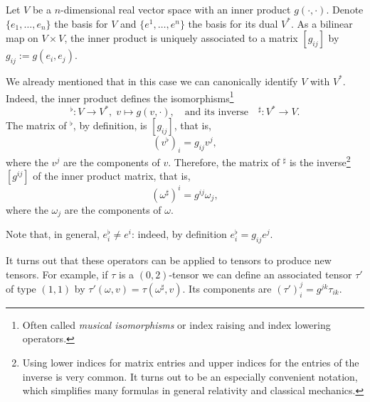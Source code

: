 \begin{example}\label{ex:musicaliso}
  Let $V$ be a $n$-dimensional real vector space with an inner product $g(\cdot, \cdot)$.
  Denote $\{e_1, \ldots, e_n\}$ the basis for $V$ and $\{e^1, \ldots, e^n\}$ the basis for its dual $V^*$.
  As a bilinear map on $V\times V$, the inner product is uniquely associated to a matrix $[g_{ij}]$ by $g_{ij} := g(e_i, e_j)$.

  We already mentioned that in this case we can canonically identify $V$ with $V^*$.
  Indeed, the inner product defines the isomorphisms\footnote{Often called \emph{musical isomorphisms} or index raising and index lowering operators.}
  \begin{equation}
    {}^\flat: V \to V^*,\; v\mapsto g(v, \cdot),
    \quad\mbox{and its inverse}\quad
    {}^\sharp: V^*\to V.
  \end{equation}
  The matrix of ${}^\flat$, by definition, is $[g_{ij}]$, that is,
  \begin{equation}
    (v^\flat)_i = g_{ij} v^j,
  \end{equation}
  where the $v^j$ are the components of $v$.
  Therefore, the matrix of ${}^\sharp$ is the inverse\footnote{Using lower indices for matrix entries and upper indices for the entries of the inverse is very common. It turns out to be an especially convenient notation, which simplifies many formulas in general relativity and classical mechanics.} $[g^{ij}]$ of the inner product matrix, that is,
  \begin{equation}
    (\omega^\sharp)^i = g^{ij}\omega_j,
  \end{equation}
  where the $\omega_j$ are the components of $\omega$.

  Note that, in general, $e^\flat_i\neq e^i$: indeed, by definition $e^\flat_i = g_{ij}e^j$.

  It turns out that these operators can be applied to tensors to produce new tensors.
  For example, if $\tau$ is a $(0,2)$-tensor we can define an associated tensor $\tau'$ of type $(1,1)$ by $\tau'(\omega, v) = \tau(\omega^\sharp, v)$.
  Its components are $(\tau')_i^j = g^{jk}\tau_{ik}$.
\end{example}

